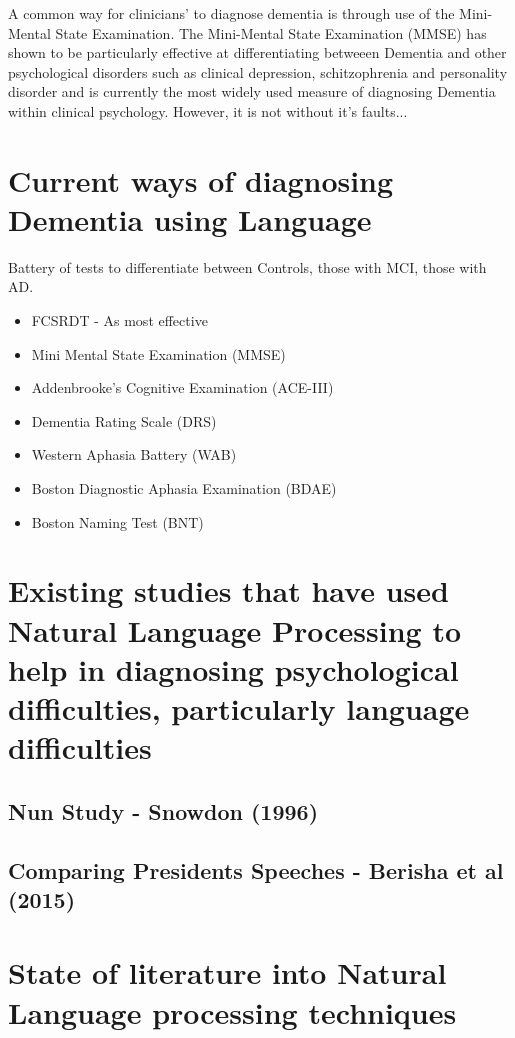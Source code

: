 \documentclass[a4paper]{article}
\begin{document}
A common way for clinicians' to diagnose dementia is through use of the Mini-Mental State Examination. The Mini-Mental State Examination (MMSE) has shown to be particularly effective at differentiating betweeen Dementia and other psychological disorders such as clinical depression, schitzophrenia and personality disorder and is currently the most widely used measure of diagnosing Dementia within clinical psychology.  However, it is not without it's faults...

\section{Current ways of diagnosing Dementia using Language}
Battery of tests to differentiate between Controls, those with MCI, those with AD. 
\begin{itemize}
	\item FCSRDT - As most effective 
	\item Mini Mental State Examination (MMSE)
	\item Addenbrooke's Cognitive Examination (ACE-III)
	\item Dementia Rating Scale (DRS)
	\item Western Aphasia Battery (WAB)
	\item Boston Diagnostic Aphasia Examination (BDAE)
	\item Boston Naming Test (BNT)
\end{itemize}

\section{Existing studies that have used Natural Language Processing to help in diagnosing psychological difficulties, particularly language difficulties}

\subsection{Nun Study - Snowdon (1996)}
\subsection{Comparing Presidents Speeches - Berisha et al (2015)}

\section{State of literature into Natural Language processing techniques}
\end{document}
